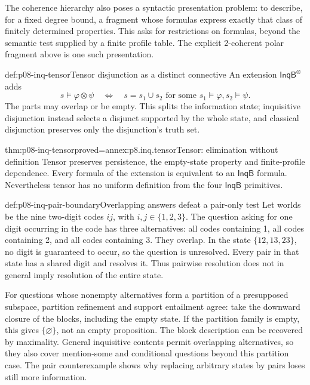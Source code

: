 The coherence hierarchy also poses a syntactic presentation problem:
to describe, for a fixed degree bound, a fragment whose formulas express
exactly that class of finitely determined properties. This asks for
restrictions on formulas, beyond the semantic test supplied by a finite
profile table. The explicit 2-coherent polar fragment above is one such
presentation.

\begin{hbdefinition}{def:p08-inq-tensor}{Tensor disjunction as a distinct connective}
An extension \(\mathsf{InqB}^{\otimes}\) adds
\[
 s\models\varphi\otimes\psi
 \quad\Longleftrightarrow\quad
 s=s_1\cup s_2\text{ for some }s_1\models\varphi, s_2\models\psi.
\]
The parts may overlap or be empty. This splits the information state;
inquisitive disjunction instead selects a disjunct supported by the whole
state, and classical disjunction preserves only the disjunction's truth set.
\end{hbdefinition}

\begin{hbtheorem}{thm:p08-inq-tensor}{proved=annex:p8.inq.tensor}{Tensor: elimination without definition}
Tensor preserves persistence, the empty-state property and finite-profile
dependence. Every formula of the extension is equivalent to an
\(\mathsf{InqB}\) formula. Nevertheless tensor has no uniform definition
from the four \(\mathsf{InqB}\) primitives.
\end{hbtheorem}

\begin{hbexample}{def:p08-inq-pair-boundary}{Overlapping answers defeat a pair-only test}
Let worlds be the nine two-digit codes \(ij\), with \(i,j\in\{1,2,3\}\).
The question asking for one digit occurring in the code has three alternatives:
all codes containing 1, all codes containing 2, and all codes containing 3.
They overlap. In the state \(\{12,13,23\}\), no digit is guaranteed to
occur, so the question is unresolved. Every pair in that state has a shared
digit and resolves it. Thus pairwise resolution does not in general imply
resolution of the entire state.
\end{hbexample}

For questions whose nonempty alternatives form a partition of a presupposed
subspace, partition refinement and support entailment agree: take the
downward closure of the blocks, including the empty state. If the partition
family is empty, this gives \(\{\varnothing\}\), not an empty proposition.
The block description can be recovered by maximality. General inquisitive
contents permit overlapping alternatives, so they also cover mention-some
and conditional questions beyond this partition case. The pair counterexample
shows why replacing arbitrary states by pairs loses still more information.

